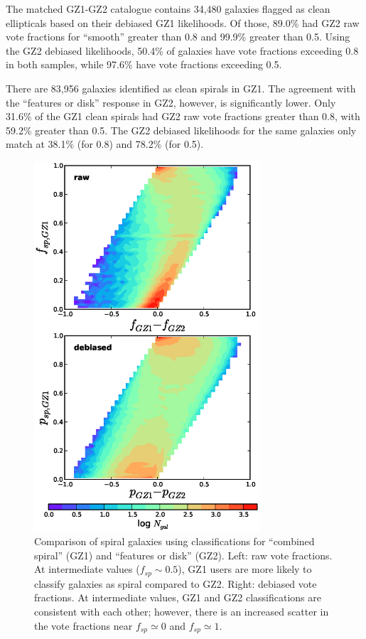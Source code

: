 \documentclass[useAMS,usenatbib]{mn2e}
\begin{document}
The matched GZ1-GZ2 catalogue contains 34,480 galaxies flagged as clean ellipticals based on their debiased GZ1 likelihoods. Of those, 89.0\% had GZ2 raw vote fractions for ``smooth'' greater than 0.8 and 99.9\% greater than 0.5. Using the GZ2 debiased likelihoods, 50.4\% of galaxies have vote fractions exceeding 0.8 in both samples, while 97.6\% have vote fractions exceeding 0.5. 

There are 83,956 galaxies identified as clean spirals in GZ1. The agreement with the ``features or disk'' response in GZ2, however, is significantly lower. Only 31.6\% of the GZ1 clean spirals had GZ2 raw vote fractions greater than 0.8, with 59.2\% greater than 0.5. The GZ2 debiased likelihoods for the same galaxies only match at 38.1\% (for 0.8) and 78.2\% (for 0.5). 

\begin{figure}
\includegraphics[angle=0,width=3.3in]{figures/gz1_gz2_trumpet.eps}
\caption{Comparison of spiral galaxies using classifications for ``combined spiral'' (GZ1) and ``features or disk'' (GZ2). Left: raw vote fractions. At intermediate values ($f_{sp}\sim0.5$), GZ1 users are more likely to classify galaxies as spiral compared to GZ2. Right: debiased vote fractions. At intermediate values, GZ1 and GZ2 classifications are consistent with each other; however, there is an increased scatter in the vote fractions near $f_{sp}\simeq0$ and $f_{sp}\simeq1$. 
\label{fig-trumpet}}
\end{figure}
\end{document}
